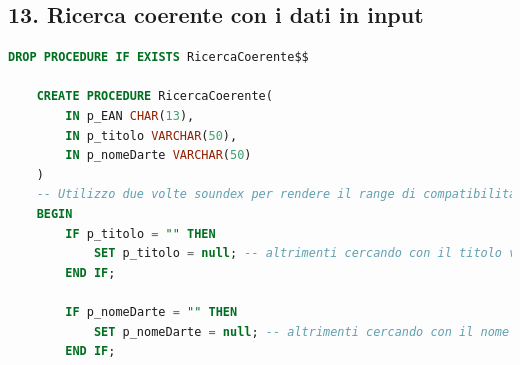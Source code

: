 \documentclass{article}
\begin{document}
\subsection*{13. Ricerca coerente con i dati in input}
\begin{lstlisting}[language=SQL]
    DROP PROCEDURE IF EXISTS RicercaCoerente$$

    CREATE PROCEDURE RicercaCoerente(
        IN p_EAN CHAR(13),
        IN p_titolo VARCHAR(50),
        IN p_nomeDarte VARCHAR(50)
    )
    -- Utilizzo due volte soundex per rendere il range di compatibilita piu ampio, l'ordine delle query e definito dall ordine di importanza dei criteri usati
    BEGIN
        IF p_titolo = "" THEN 
            SET p_titolo = null; -- altrimenti cercando con il titolo vuoto mi verrebbero restituiti tutti i dischi del sistema
        END IF;
        
        IF p_nomeDarte = "" THEN
            SET p_nomeDarte = null; -- altrimenti cercando con il nome d'arte vuoto mi verrebbero restituiti tutti i dischi del sistema
        END IF;
        

\end{lstlisting}
\end{document}
